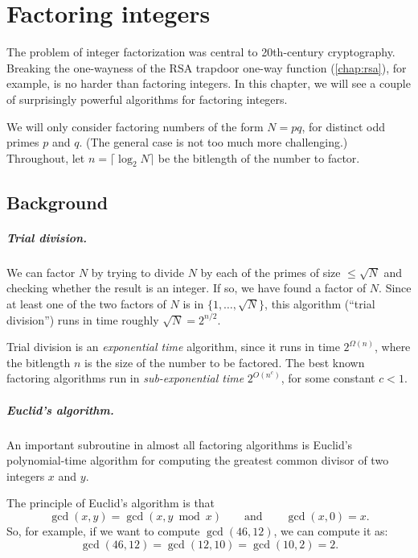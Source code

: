 \chapter{Factoring integers}
\label{sec:fact}

The problem of integer factorization was central to 20th-century cryptography.
Breaking the one-wayness of the RSA trapdoor one-way function (\cref{chap:rsa}), for example,
is no harder than factoring integers.
In this chapter, we will see a couple of surprisingly powerful algorithms for factoring integers.

We will only consider factoring numbers of the form $N=pq$, for distinct odd primes $p$ and $q$.
(The general case is not too much more challenging.)
Throughout, let $n = \lceil \log_2 N \rceil$ be the bitlength of the number to factor.

\section{Background}
\label{sec:fact:bg}

\paragraph{Trial division.}
We can factor $N$ by trying to divide $N$ by each of the primes of size $\leq \sqrt N$
and checking whether the result is an integer.
If so, we have found a factor of $N$.
Since at least one of the two factors of $N$ is in $\{1, \dots, \sqrt N\}$, this
algorithm (``trial division'') runs in time roughly $\sqrt{N} = 2^{n/2}$.

Trial division is an \emph{exponential time} algorithm, since it runs in time $2^{\Omega(n)}$,
where the bitlength $n$ is the size of the number to be factored.
The best known factoring algorithms run in \emph{sub-exponential time} $2^{O(n^c)}$,
for some constant $c < 1$.


\paragraph{Euclid's algorithm.}
An important subroutine in almost all factoring algorithms is Euclid's polynomial-time algorithm
for computing the greatest common divisor of two integers $x$ and $y$.

The principle of Euclid's algorithm is that
\[ \gcd(x, y) = \gcd(x, y \bmod x) \qquad \text{and} \qquad \gcd(x, 0) = x.\]
So, for example, if we want to compute $\gcd(46, 12)$, we can compute it as:
\[ \gcd(46,12) = \gcd(12, 10) = \gcd(10, 2) = 2. \]

